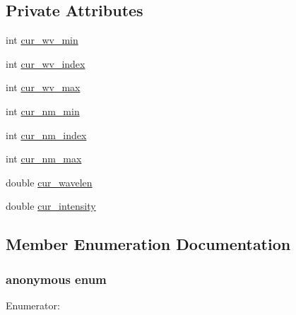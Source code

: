 \subsection*{Private Attributes}
\begin{DoxyCompactItemize}
\item 
int \hyperlink{classCWavlenCursor_ad3dc67ff86d2449e8edd0ab6b2fbf870}{cur\_\-wv\_\-min}
\item 
int \hyperlink{classCWavlenCursor_ad197cf25322f45cea6873263ff5e7b8d}{cur\_\-wv\_\-index}
\item 
int \hyperlink{classCWavlenCursor_a3101943218f7a8cc52adebb73f1ef779}{cur\_\-wv\_\-max}
\item 
int \hyperlink{classCWavlenCursor_aa6b6e05e1dc841fc626e5b28aa85d35c}{cur\_\-nm\_\-min}
\item 
int \hyperlink{classCWavlenCursor_aa14d6b28cf6824c4d0d725947f2403da}{cur\_\-nm\_\-index}
\item 
int \hyperlink{classCWavlenCursor_a63ab6490b4cfb1b6603a877a35775526}{cur\_\-nm\_\-max}
\item 
double \hyperlink{classCWavlenCursor_a7c9bc51a8fd1e98c7a3a10a2f6222d03}{cur\_\-wavelen}
\item 
double \hyperlink{classCWavlenCursor_a60cb232b75c734260959d991f895fa1d}{cur\_\-intensity}
\end{DoxyCompactItemize}


\subsection{Member Enumeration Documentation}
\hypertarget{classCWavlenCursor_a96d76ca77dadc0d696e093e1b8c25359}{
\subsubsection[{"@12}]{\setlength{\rightskip}{0pt plus 5cm}anonymous enum}}
\label{classCWavlenCursor_a96d76ca77dadc0d696e093e1b8c25359}
\begin{Desc}
\item[Enumerator: ]\par
\begin{description}
\item[{\em 
\hypertarget{classCWavlenCursor_a96d76ca77dadc0d696e093e1b8c25359abf71df3d9858c0f33aa3a09d1c635577}{
IDD}
\label{classCWavlenCursor_a96d76ca77dadc0d696e093e1b8c25359abf71df3d9858c0f33aa3a09d1c635577}
}]\end{description}
\end{Desc}



